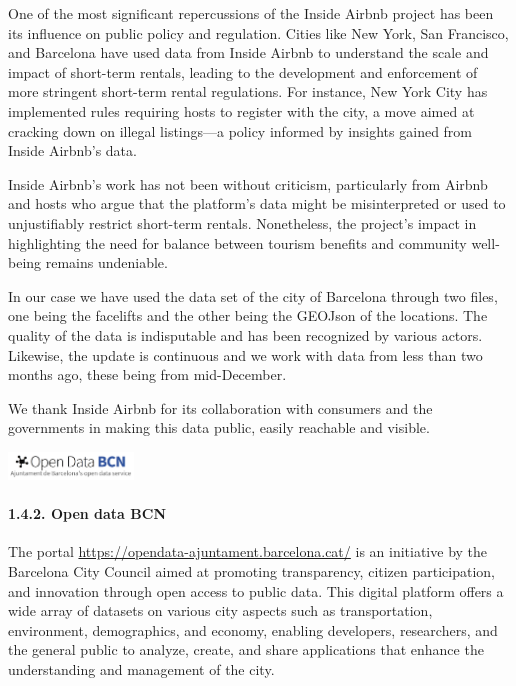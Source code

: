 \documentclass[
]{article}
\begin{document}
One of the most significant repercussions of the Inside Airbnb project
has been its influence on public policy and regulation. Cities like New
York, San Francisco, and Barcelona have used data from Inside Airbnb to
understand the scale and impact of short-term rentals, leading to the
development and enforcement of more stringent short-term rental
regulations. For instance, New York City has implemented rules requiring
hosts to register with the city, a move aimed at cracking down on
illegal listings---a policy informed by insights gained from Inside
Airbnb's data.

Inside Airbnb's work has not been without criticism, particularly from
Airbnb and hosts who argue that the platform's data might be
misinterpreted or used to unjustifiably restrict short-term rentals.
Nonetheless, the project's impact in highlighting the need for balance
between tourism benefits and community well-being remains undeniable.

In our case we have used the data set of the city of Barcelona through
two files, one being the facelifts and the other being the GEOJson of
the locations. The quality of the data is indisputable and has been
recognized by various actors. Likewise, the update is continuous and we
work with data from less than two months ago, these being from
mid-December.

We thank Inside Airbnb for its collaboration with consumers and the
governments in making this data public, easily reachable and visible.

\includegraphics[width=0.25\textwidth,height=\textheight]{Assets/OpenDataBCN.png}

\hypertarget{open-data-bcn}{%
\paragraph{1.4.2. Open data BCN}\label{open-data-bcn}}

The portal \url{https://opendata-ajuntament.barcelona.cat/} is an
initiative by the Barcelona City Council aimed at promoting
transparency, citizen participation, and innovation through open access
to public data. This digital platform offers a wide array of datasets on
various city aspects such as transportation, environment, demographics,
and economy, enabling developers, researchers, and the general public to
analyze, create, and share applications that enhance the understanding
and management of the city.
\end{document}
